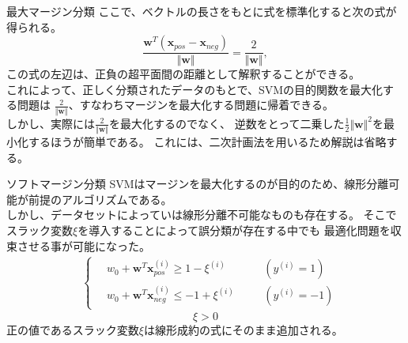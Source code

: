 \documentclass[aspectratio=169, dvipdfmx, 11pt]{beamer} %
\begin{document}
\begin{frame}{最大マージン分類}
    ここで、ベクトルの長さをもとに式を標準化すると次の式が得られる。
    \begin{equation*}
        \frac{\textbf{w}^T (\textbf{x}_{pos} - \textbf{x}_{neg})}{\Vert\textbf{w}\Vert} = \frac{2}{\Vert\textbf{w}\Vert}, 
    \end{equation*}
    この式の左辺は、正負の超平面間の距離として解釈することができる。\\
    これによって、正しく分類されたデータのもとで、SVMの目的関数を最大化する問題は
    \(\frac{2}{\Vert\textbf{w}\Vert}\)、すなわちマージンを最大化する問題に帰着できる。\\
    しかし、実際には\(\frac{2}{\Vert\textbf{w}\Vert}\)を最大化するのでなく、
    逆数をとって二乗した\(\frac{1}{2}\Vert\textbf{w}\Vert^2\)を最小化するほうが簡単である。
    これには、二次計画法を用いるため解説は省略する。
\end{frame}

\begin{frame}{ソフトマージン分類}
    SVMはマージンを最大化するのが目的のため、線形分離可能が前提のアルゴリズムである。\\
    しかし、データセットによっていは線形分離不可能なものも存在する。
    そこでスラック変数\(\xi\)を導入することによって誤分類が存在する中でも
    最適化問題を収束させる事が可能になった。
    \begin{equation*}
        \begin{aligned}
            & \left\{ \,
                \begin{aligned}
                    & w_0 + \textbf{w}^T \textbf{x}_{pos}^{(i)} \geq  1 - \xi^{(i)} & \quad &(y^{(i)} = 1)\\
                    & w_0 + \textbf{w}^T \textbf{x}_{neg}^{(i)} \leq  -1 + \xi^{(i)} & \quad &(y^{(i)} = -1)
                \end{aligned}
            \right.
        \end{aligned}
    \end{equation*}
    \begin{equation*}
        \xi > 0
    \end{equation*}
    正の値であるスラック変数\(\xi\)は線形成約の式にそのまま追加される。
\end{frame}
\end{document}
